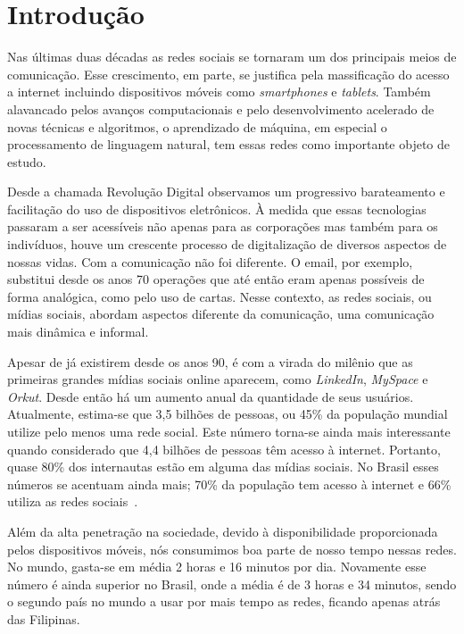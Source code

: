\chapter{Introdução}
\label{chapter:intro}

Nas últimas duas décadas as redes sociais se tornaram um dos principais meios de
comunicação.
Esse crescimento, em parte, se justifica pela massificação do acesso a internet
incluindo dispositivos móveis como \textit{smartphones} e \textit{tablets}.
Também alavancado pelos avanços computacionais e pelo desenvolvimento acelerado
de novas técnicas e algoritmos, o aprendizado de máquina, em especial o
processamento de linguagem natural, tem essas redes como importante objeto de
estudo.

Desde a chamada Revolução Digital observamos um progressivo barateamento e
facilitação do uso de dispositivos eletrônicos.
À medida que essas tecnologias passaram a ser acessíveis não apenas para as
corporações mas também para os indivíduos, houve um crescente processo de
digitalização de diversos aspectos de nossas vidas.
Com a comunicação não foi diferente.
O email, por exemplo, substitui desde os anos 70 operações que até então eram
apenas possíveis de forma analógica, como pelo uso de cartas.
Nesse contexto, as redes sociais, ou mídias sociais, abordam aspectos diferente
da comunicação, uma comunicação mais dinâmica e informal.

Apesar de já existirem desde os anos 90, é com a virada do milênio que as
primeiras grandes mídias sociais online aparecem, como \textit{LinkedIn},
\textit{MySpace} e \textit{Orkut}.
Desde então há um aumento anual da quantidade de seus usuários.
Atualmente, estima-se que 3,5 bilhões de pessoas, ou 45\% da população mundial
utilize pelo menos uma rede social.
Este número torna-se ainda mais interessante quando considerado que 4,4 bilhões
de pessoas têm acesso à internet.
Portanto, quase 80\% dos internautas estão em alguma das mídias sociais.
No Brasil esses números se acentuam ainda mais; 70\% da população tem
acesso à internet e 66\% utiliza as redes sociais~\cite{social19}.

Além da alta penetração na sociedade, devido à disponibilidade proporcionada
pelos dispositivos móveis,  nós consumimos boa parte de nosso tempo nessas redes.
No mundo, gasta-se em média 2 horas e 16 minutos por dia.
Novamente esse número é ainda superior no Brasil, onde a média é de 3 horas e
34 minutos, sendo o segundo país no mundo a usar por mais tempo as redes, ficando
apenas atrás das Filipinas.

